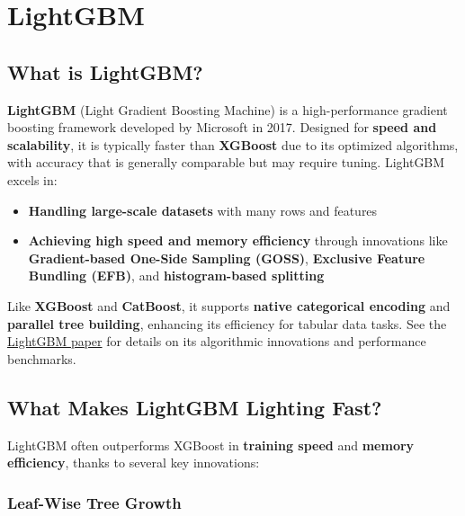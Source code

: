 \documentclass[
  letterpaper,
  DIV=11,
  numbers=noendperiod]{scrreprt}
\providecommand{\tightlist}{%
  \setlength{\itemsep}{0pt}\setlength{\parskip}{0pt}}\usepackage{longtable,booktabs,array}
\begin{document}
\section{LightGBM}\label{lightgbm}

\subsection{What is LightGBM?}\label{what-is-lightgbm}

\textbf{LightGBM} (Light Gradient Boosting Machine) is a
high-performance gradient boosting framework developed by Microsoft in
2017. Designed for \textbf{speed and scalability}, it is typically
faster than \textbf{XGBoost} due to its optimized algorithms, with
accuracy that is generally comparable but may require tuning. LightGBM
excels in:

\begin{itemize}
\tightlist
\item
  \textbf{Handling large-scale datasets} with many rows and features
\item
  \textbf{Achieving high speed and memory efficiency} through
  innovations like \textbf{Gradient-based One-Side Sampling (GOSS)},
  \textbf{Exclusive Feature Bundling (EFB)}, and \textbf{histogram-based
  splitting}
\end{itemize}

Like \textbf{XGBoost} and \textbf{CatBoost}, it supports \textbf{native
categorical encoding} and \textbf{parallel tree building}, enhancing its
efficiency for tabular data tasks. See the
\href{https://proceedings.neurips.cc/paper/2017/file/6449f44a102fde848669bdd9eb6b76fa-Paper.pdf}{LightGBM
paper} for details on its algorithmic innovations and performance
benchmarks.

\subsection{What Makes LightGBM Lighting
Fast?}\label{what-makes-lightgbm-lighting-fast}

LightGBM often outperforms XGBoost in \textbf{training speed} and
\textbf{memory efficiency}, thanks to several key innovations:

\subsubsection{Leaf-Wise Tree Growth}\label{leaf-wise-tree-growth}
\end{document}
